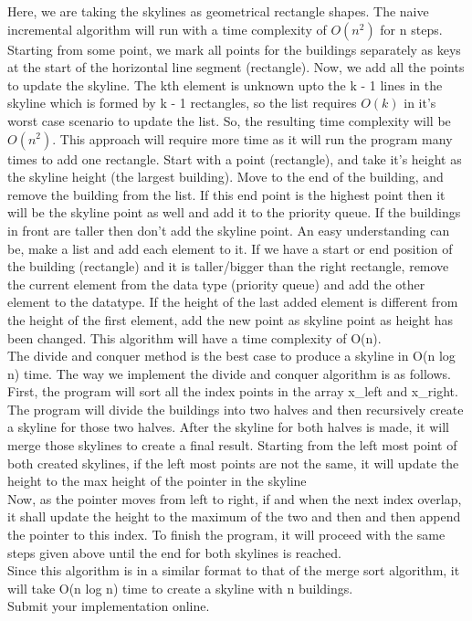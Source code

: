 \documentclass[12pt, twoside]{article}
\begin{document}
\begin{problems}
\begin{problemparts}
\problempart %
Here, we are taking the skylines as geometrical rectangle shapes. The naive incremental algorithm will run with a time complexity of $O(n^2)$ for n steps. Starting from  some point, we mark all points for the buildings separately as keys at the start of the horizontal line segment (rectangle). Now, we add all the points to update the skyline. The kth element is unknown upto the k - 1 lines in the skyline which is formed by k - 1 rectangles, so the list requires $O(k)$ in it’s worst case scenario to update the list. So, the resulting time complexity will be $O(n^2)$. This approach will require more time as it will run the program many times to add one rectangle.
\problempart %
Start with a point (rectangle), and take it’s height as the skyline height (the largest building). Move to the end of the building, and remove the building from the list. If this end point is the highest point then it will be the skyline point as well and add it to the priority queue. If the buildings in front are taller then don’t add the skyline point. 
An easy understanding can be, make a list and add each element to it. If we have a start or end position of the building (rectangle) and it is taller/bigger than the right rectangle, remove the current element from the data type (priority queue) and add the other element to the datatype. If the height of the last added element is different from the height of the first element, add the new point as skyline point as height has been changed.  This algorithm will have a time complexity of O(n). \\
\problempart %
The divide and conquer method is the best case to produce a skyline in O(n log n) time. The way we implement the divide and conquer algorithm is as follows.\\
\newline
First, the program will sort all the index points in the array x\_left and x\_right. The program will divide the buildings into two halves and then recursively create a skyline for those two halves. After the skyline for both halves is made, it will merge those skylines to create a final result. Starting from the left most point of both created skylines, if the left most points are not the same, it will update the height to the max height of the pointer in the skyline\\
\newline
Now, as the pointer moves from left to right, if and when the next index overlap, it shall update the height to the maximum of the two and then  and then append the pointer to this index. To finish the program, it will proceed with the same steps given above until the end for both skylines is reached.\\
\newline
Since this algorithm is in a similar format to that of the merge sort algorithm, it will take O(n log n) time to create a skyline with n buildings.\\

\problempart Submit your implementation online.
\end{problemparts}

\end{problems}
\end{document}

